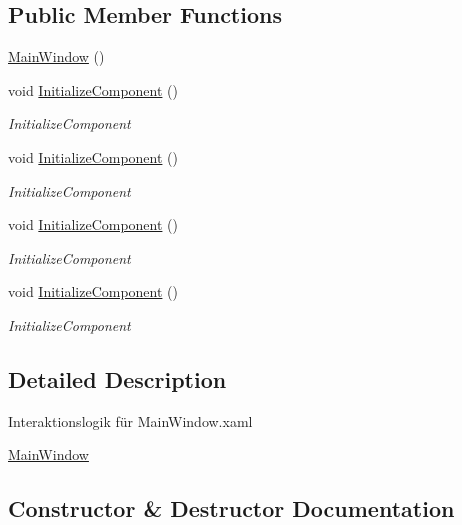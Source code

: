 \subsection*{Public Member Functions}
\begin{DoxyCompactItemize}
\item 
\hyperlink{class_rowing_monitor_1_1_main_window_aa33d7965b0fa09c32b1e7e2f782817d0}{Main\+Window} ()
\item 
void \hyperlink{class_rowing_monitor_1_1_main_window_afe76deea60e7fd9a534277f34037d22c}{Initialize\+Component} ()
\begin{DoxyCompactList}\small\item\em Initialize\+Component \end{DoxyCompactList}\item 
void \hyperlink{class_rowing_monitor_1_1_main_window_afe76deea60e7fd9a534277f34037d22c}{Initialize\+Component} ()
\begin{DoxyCompactList}\small\item\em Initialize\+Component \end{DoxyCompactList}\item 
void \hyperlink{class_rowing_monitor_1_1_main_window_afe76deea60e7fd9a534277f34037d22c}{Initialize\+Component} ()
\begin{DoxyCompactList}\small\item\em Initialize\+Component \end{DoxyCompactList}\item 
void \hyperlink{class_rowing_monitor_1_1_main_window_afe76deea60e7fd9a534277f34037d22c}{Initialize\+Component} ()
\begin{DoxyCompactList}\small\item\em Initialize\+Component \end{DoxyCompactList}\end{DoxyCompactItemize}


\subsection{Detailed Description}
Interaktionslogik für Main\+Window.\+xaml 

\hyperlink{class_rowing_monitor_1_1_main_window}{Main\+Window} 

\subsection{Constructor \& Destructor Documentation}
\mbox{\label{class_rowing_monitor_1_1_main_window_aa33d7965b0fa09c32b1e7e2f782817d0}} 
